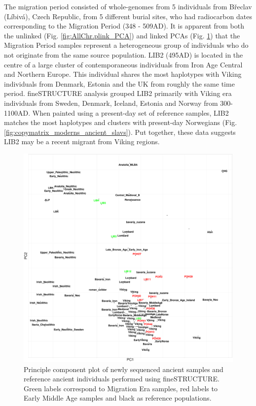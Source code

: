 The migration period consisted of whole-genomes from 5 individuals from Břeclav (Líbivá), Czech Republic, from 5 different burial sites, who had radiocarbon dates corresponding to the Migration Period (348 - 509AD). It is apparent from both the unlinked (Fig. \ref{fig:AllChr.plink_PCA}) and linked PCAs (Fig. \ref{fig:fs_PCA}) that the Migration Period samples represent a heterogeneous group of individuals who do not originate from the same source population. LIB2 (495AD) is located in the centre of a large cluster of contemporaneous individuals from Iron Age Central and Northern Europe. This individual shares the most haplotypes with Viking individuals from Denmark, Estonia and the UK from roughly the same time period. fineSTRUCTURE analysis grouped LIB2 primarily with Viking era individuals from Sweden, Denmark, Iceland, Estonia and Norway from 300-1100AD. When painted using a present-day set of reference samples, LIB2 matches the most haplotypes and clusters with present-day Norwegians (Fig. \ref{fig:copymatrix_moderns_ancient_slavs}). Put together, these data suggests LIB2 may be a recent migrant from Viking regions. 

\begin{figure}[htp]
    \centering
    \includegraphics[width=1.0\textwidth]{../images/chapter5/fs_PCA.pdf}
    \caption{Principle component plot of newly sequenced ancient samples and reference ancient individuals performed using fineSTRUCTURE. Green labels correspond to Migration Era samples, red labels to Early Middle Age samples and black as reference populations.}
    \label{fig:fs_PCA}
\end{figure}

